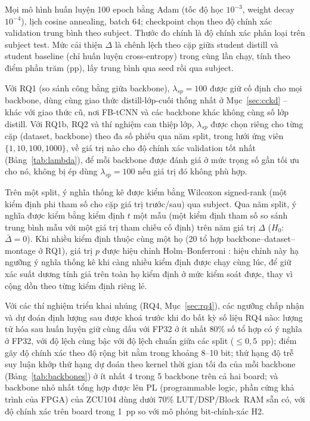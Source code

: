 \documentclass[11pt,a4paper,twoside,asymmetric]{article}
\begin{document}
Mọi mô hình huấn luyện 100 epoch bằng Adam (tốc độ học $10^{-3}$, weight decay $10^{-4}$), lịch cosine annealing, batch 64; checkpoint chọn theo độ chính xác validation trung bình theo subject. Thước đo chính là độ chính xác phân loại trên subject test. Mức cải thiện $\Delta$ là chênh lệch theo cặp giữa student distill và student baseline (chỉ huấn luyện cross-entropy) trong cùng lần chạy, tính theo điểm phần trăm (pp), lấy trung bình qua seed rồi qua subject.

Với RQ1 (so sánh công bằng giữa backbone), $\lambda_{sp}=100$ được giữ cố định cho mọi backbone, dùng cùng giao thức distill-lớp-cuối thống nhất ở Mục~\ref{sec:cckd} -- khác với giao thức cũ, nơi FB-tCNN và các backbone khác không cùng số lớp distill. Với RQ1b, RQ2 và thí nghiệm can thiệp lớp, $\lambda_{sp}$ được chọn riêng cho từng cặp (dataset, backbone) theo đa số phiếu qua năm split, trong lưới ứng viên $\{1, 10, 100, 1000\}$, về giá trị nào cho độ chính xác validation tốt nhất (Bảng~\ref{tab:lambda}), để mỗi backbone được đánh giá ở mức trọng số gần tối ưu cho nó, không bị ép dùng $\lambda_{sp}=100$ nếu giá trị đó không phù hợp.

Trên một split, ý nghĩa thống kê được kiểm bằng Wilcoxon signed-rank (một kiểm định phi tham số cho cặp giá trị trước/sau) qua subject. Qua năm split, ý nghĩa được kiểm bằng kiểm định $t$ một mẫu (một kiểm định tham số so sánh trung bình mẫu với một giá trị tham chiếu cố định) trên năm giá trị $\Delta$ ($H_0$: $\bar\Delta = 0$). Khi nhiều kiểm định thuộc cùng một họ (20 tổ hợp backbone--dataset--montage ở RQ1), giá trị $p$ được hiệu chỉnh Holm--Bonferroni \cite{R86}: hiệu chỉnh này hạ ngưỡng ý nghĩa thống kê khi càng nhiều kiểm định được chạy cùng lúc, để giữ xác suất dương tính giả trên toàn họ kiểm định ở mức kiểm soát được, thay vì cộng dồn theo từng kiểm định riêng lẻ.

Với các thí nghiệm triển khai nhúng (RQ4, Mục~\ref{sec:rq4}), các ngưỡng chấp nhận và dự đoán định lượng sau được khoá trước khi đo bất kỳ số liệu RQ4 nào: lượng tử hóa sau huấn luyện giữ cùng dấu với FP32 ở ít nhất 80\% số tổ hợp có ý nghĩa ở FP32, với độ lệch cùng bậc với độ lệch chuẩn giữa các split ($\leq 0{,}5$~pp); điểm gãy độ chính xác theo độ rộng bit nằm trong khoảng 8--10 bit; thứ hạng độ trễ suy luận khớp thứ hạng dự đoán theo kernel thời gian tối đa của mỗi backbone (Bảng~\ref{tab:backbones}) ở ít nhất 4 trong 5 backbone trên cả hai board; và backbone nhỏ nhất tổng hợp được lên PL (programmable logic, phần cứng khả trình của FPGA) của ZCU104 dùng dưới 70\% LUT/DSP/Block~RAM sẵn có, với độ chính xác trên board trong 1~pp so với mô phỏng bit-chính-xác H2.
\end{document}
